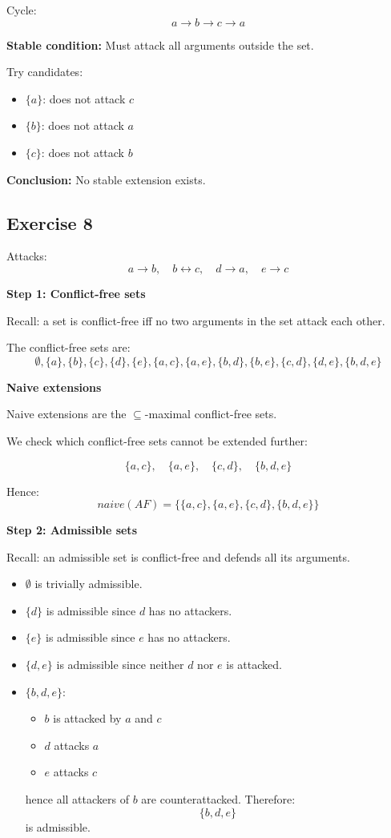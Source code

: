 \documentclass[11pt]{article}
\begin{document}
Cycle:
\[
a \to b \to c \to a
\]

\textbf{Stable condition:}
Must attack all arguments outside the set.

Try candidates:
\begin{itemize}
    \item $\{a\}$: does not attack $c$
    \item $\{b\}$: does not attack $a$
    \item $\{c\}$: does not attack $b$
\end{itemize}

\textbf{Conclusion:}
No stable extension exists.

\subsection{Exercise 8}

Attacks:
\[
a \to b,\quad b \leftrightarrow c,\quad d \to a,\quad e \to c
\]

\textbf{Step 1: Conflict-free sets}

Recall: a set is conflict-free iff no two arguments in the set attack each other.

The conflict-free sets are:
\[
\emptyset,
\{a\},
\{b\},
\{c\},
\{d\},
\{e\},
\{a,c\},
\{a,e\},
\{b,d\},
\{b,e\},
\{c,d\},
\{d,e\},
\{b,d,e\}
\]

\textbf{Naive extensions}

Naive extensions are the $\subseteq$-maximal conflict-free sets.

We check which conflict-free sets cannot be extended further:

\[
\{a,c\},\quad
\{a,e\},\quad
\{c,d\},\quad
\{b,d,e\}
\]

Hence:
\[
\textit{naive}(AF)=
\{
\{a,c\},
\{a,e\},
\{c,d\},
\{b,d,e\}
\}
\]

\textbf{Step 2: Admissible sets}

Recall: an admissible set is conflict-free and defends all its arguments.

\begin{itemize}
    \item $\emptyset$ is trivially admissible.

    \item $\{d\}$ is admissible since $d$ has no attackers.

    \item $\{e\}$ is admissible since $e$ has no attackers.

    \item $\{d,e\}$ is admissible since neither $d$ nor $e$ is attacked.

    \item $\{b,d,e\}$:
    \begin{itemize}
        \item $b$ is attacked by $a$ and $c$
        \item $d$ attacks $a$
        \item $e$ attacks $c$
    \end{itemize}
    hence all attackers of $b$ are counterattacked.
    Therefore:
    \[
    \{b,d,e\}
    \]
    is admissible.
\end{itemize}
\end{document}
